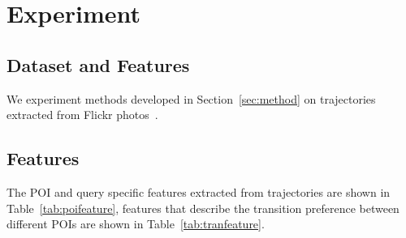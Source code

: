 \section{Experiment}
\label{sec:experiment}

\subsection{Dataset and Features}
\label{sec:dataset}

We experiment methods developed in Section~\ref{sec:method} on trajectories extracted from Flickr photos~\cite{thomee2016yfcc100m}.

\subsection{Features}
\label{sec:feature}

The POI and query specific features extracted from trajectories are shown in Table~\ref{tab:poifeature},
features that describe the transition preference between different POIs are shown in Table~\ref{tab:tranfeature}.

